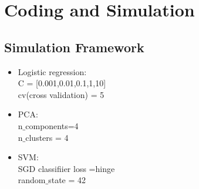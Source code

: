 \documentclass{article}
\begin{document}
\section{Coding and Simulation} 
\subsection{Simulation Framework}
    \begin{itemize}
        \item Logistic regression:
        \\C = [0.001,0.01,0.1,1,10]
        \\cv(cross validation) = 5
        
        \item PCA:
        \\n$\_$components=4
        \\n$\_$clusters = 4
        
        \item SVM: 
        \\SGD classifiier  loss =hinge
        \\random$\_$state = 42
    \end{itemize}

\newpage
\end{document}
